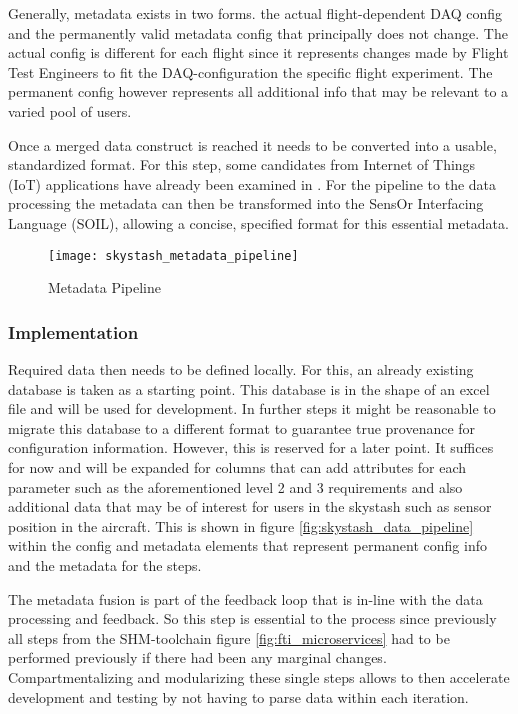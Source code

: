 Generally, metadata exists in two forms. the actual flight-dependent DAQ config and the permanently valid metadata config that principally does not change. The actual config is different for each flight since it represents changes made by Flight Test Engineers to fit the DAQ-configuration the specific flight experiment. The permanent config however represents all additional info that may be relevant to a varied pool of users.


Once a merged data construct is reached it needs to be converted into a usable, standardized format. For this step, some candidates from Internet of Things (IoT) applications have already been examined in \textcite{bodenbenner_model-driven_2022}. For the pipeline to the data processing the metadata can then be transformed into the SensOr Interfacing Language (SOIL), allowing a concise, specified format for this essential metadata.

\begin{figure}
    \centering
    \texttt{[image: skystash\_metadata\_pipeline]}
    \caption{Metadata Pipeline}
    \label{fig:skystash_metadata_pipeline}
\end{figure}

\subsubsection{Implementation}
Required data then needs to be defined locally. For this, an already existing database is taken as a starting point. This database is in the shape of an excel file and will be used for development. In further steps it might be reasonable to migrate this database to a different format to guarantee true provenance for configuration information. However, this is reserved for a later point. It suffices for now and will be expanded for columns that can add attributes for each parameter such as the aforementioned level 2 and 3 requirements and also additional data that may be of interest for users in the skystash such as sensor position in the aircraft. This is shown in figure \ref{fig:skystash_data_pipeline} within the config and metadata elements that represent permanent config info and the metadata for the steps.

The metadata fusion is part of the feedback loop that is in-line with the data processing and feedback. So this step is essential to the process since previously all steps from the SHM-toolchain figure \ref{fig:fti_microservices} had to be performed previously if there had been any marginal changes. Compartmentalizing and modularizing these single steps allows to then accelerate development and testing by not having to parse data within each iteration.

